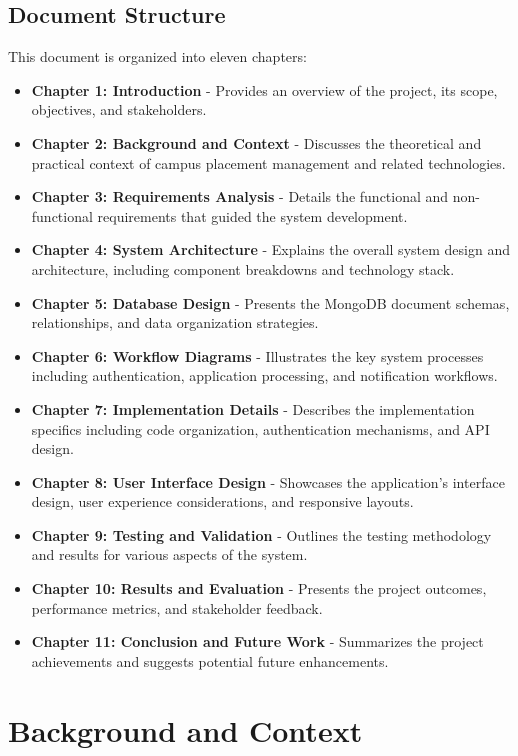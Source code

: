 \documentclass[12pt,a4paper]{report}
\begin{document}
\section{Document Structure}
This document is organized into eleven chapters:
\begin{itemize}
    \item \textbf{Chapter 1: Introduction} - Provides an overview of the project, its scope, objectives, and stakeholders.
    \item \textbf{Chapter 2: Background and Context} - Discusses the theoretical and practical context of campus placement management and related technologies.
    \item \textbf{Chapter 3: Requirements Analysis} - Details the functional and non-functional requirements that guided the system development.
    \item \textbf{Chapter 4: System Architecture} - Explains the overall system design and architecture, including component breakdowns and technology stack.
    \item \textbf{Chapter 5: Database Design} - Presents the MongoDB document schemas, relationships, and data organization strategies.
    \item \textbf{Chapter 6: Workflow Diagrams} - Illustrates the key system processes including authentication, application processing, and notification workflows.
    \item \textbf{Chapter 7: Implementation Details} - Describes the implementation specifics including code organization, authentication mechanisms, and API design.
    \item \textbf{Chapter 8: User Interface Design} - Showcases the application's interface design, user experience considerations, and responsive layouts.
    \item \textbf{Chapter 9: Testing and Validation} - Outlines the testing methodology and results for various aspects of the system.
    \item \textbf{Chapter 10: Results and Evaluation} - Presents the project outcomes, performance metrics, and stakeholder feedback.
    \item \textbf{Chapter 11: Conclusion and Future Work} - Summarizes the project achievements and suggests potential future enhancements.
\end{itemize}

\chapter{Background and Context}
\end{document}
